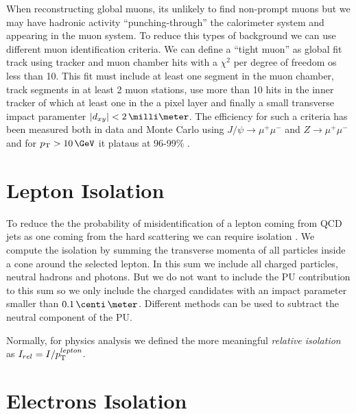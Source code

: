 When reconstructing global muons, its unlikely to find non-prompt muons but we may have hadronic activity ``punching-through'' the calorimeter system and appearing in the muon system. To reduce this types of background we can use different muon identification criteria. We can define a ``tight muon'' as global fit track using tracker and muon chamber hits with a $\chi^2$ per degree of freedom os less than 10. This fit must include at least one segment in the muon chamber, track segments in at least 2 muon stations, use more than 10 hits in the inner tracker of which at least one in the a pixel layer and finally a small transverse impact paramenter $|d_{xy}|< 2\,\milli\meter$. The efficiency for such a criteria has been measured both in data and Monte Carlo using $J/\psi \rightarrow \mu^+ \mu^-$ and $Z \rightarrow \mu^+ \mu^-$ and for $\pt > 10 \,\GeV$ it plataus at 96-99\% \cite{ARTICLE:CMSMuonReconstruction7TeV}.

\section{Lepton Isolation}
\label{SECTION:EventReconstructionPhysicsObjects_LeptonIsolation}

To reduce the the probability of misidentification of a lepton coming from \gls{QCD} jets as one coming from the hard scattering we can require isolation \cite{ARTICLE:CMSElectronReconstruction8TeV, ARTICLE:CMSMuonReconstruction7TeV}. We compute the isolation by summing the transverse momenta of all particles inside a cone around the selected lepton. In this sum we include all charged particles, neutral hadrons and photons. But we do not want to include the \gls{PU} contribution to this sum so we only include the charged candidates with an impact parameter smaller than $0.1 \,\centi\,\meter$. Different methods can be used to subtract the neutral component of the \gls{PU}.

Normally, for physics analysis we defined the more meaningful \textit{relative isolation} as $I_{rel} = I/p_{\mathrm{T}}^{lepton}$.

\section{Electrons Isolation}
\label{SUBSECTION:EventReconstructionPhysicsObjects_LeptonIsolation_ElectronsIsolation}

